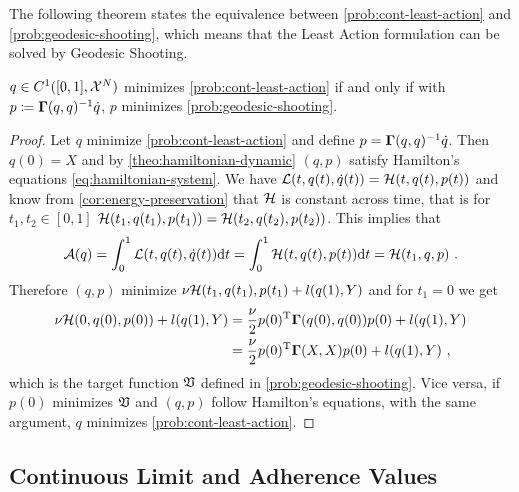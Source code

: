 The following theorem states the equivalence between \cref{prob:cont-least-action} and \cref{prob:geodesic-shooting}, which means that the Least Action formulation can be solved by Geodesic Shooting.
\begin{theorem}
	\label{theo:geodesic-shooting}
	$q \in C^1([0, 1], \mathcal{X}^N)$ minimizes \cref{prob:cont-least-action} if and only if with $p\coloneqq \mathbf{\Gamma}(q, q)^{-1}\dot{q}$, $p$ minimizes \cref{prob:geodesic-shooting}.
\end{theorem}
\begin{proof}
	Let $q$ minimize \cref{prob:cont-least-action} and define $p = \mathbf{\Gamma}(q, q)^{-1}\dot{q}$.
	Then $q(0) = X$ and by \cref{theo:hamiltonian-dynamic} $(q, p)$ satisfy Hamilton's equations \ref{eq:hamiltonian-system}.
	We have $\mathcal{L}(t, q(t), \dot{q}(t)) = \mathcal{H}(t, q(t), p(t))$ and know from \cref{cor:energy-preservation} that $\mathcal{H}$ is constant across time, that is for $t_1, t_2 \in [0, 1]$ $\mathcal{H}(t_1, q(t_1), p(t_1)) = \mathcal{H}(t_2, q(t_2), p(t_2))$.
	This implies that
	\begin{equation}
	\mathcal{A}(q) = \int_{0}^{1} \cL(t, q(t), \dot{q}(t)) \mathrm{d}t 
	= \int_{0}^{1} \cH(t, q(t), p(t)) \mathrm{d}t = \cH(t_1, q, p) \ .
	\end{equation}
	Therefore $(q, p)$ minimize $\nu \mathcal{H}(t_1, q(t_1), p(t_1) + l(q(1), Y)$ and for $t_1 = 0$ we get
	\begin{align}
	\nu \mathcal{H}(0, q(0), p(0)) + l(q(1), Y) &= \frac{\nu}{2} p(0)^{\mathrm{T}} \mathbf{\Gamma}(q(0), q(0))p(0) + l(q(1), Y)\\
	&= \frac{\nu}{2} p(0)^{\mathrm{T}} \mathbf{\Gamma}(X, X)p(0) + l(q(1), Y) \ ,
	\end{align}
	which is the target function $\mathfrak{V}$ defined in \cref{prob:geodesic-shooting}.
	Vice versa, if $p(0)$ minimizes $\mathfrak{V}$ and $(q, p)$ follow Hamilton's equations, with the same argument, $q$ minimizes \cref{prob:cont-least-action}.
\end{proof}

\subsection{Continuous Limit and Adherence Values}

